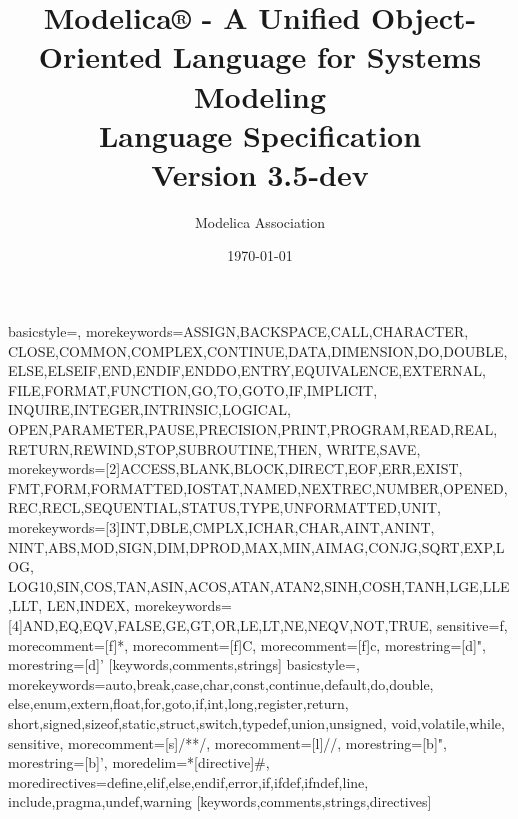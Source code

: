%
  {basicstyle=\footnotesize\ttfamily,        %
   morekeywords={ASSIGN,BACKSPACE,CALL,CHARACTER,%
      CLOSE,COMMON,COMPLEX,CONTINUE,DATA,DIMENSION,DO,DOUBLE,%
      ELSE,ELSEIF,END,ENDIF,ENDDO,ENTRY,EQUIVALENCE,EXTERNAL,%
      FILE,FORMAT,FUNCTION,GO,TO,GOTO,IF,IMPLICIT,%
      INQUIRE,INTEGER,INTRINSIC,LOGICAL,%
      OPEN,PARAMETER,PAUSE,PRECISION,PRINT,PROGRAM,READ,REAL,%
      RETURN,REWIND,STOP,SUBROUTINE,THEN,%
      WRITE,SAVE},%
    morekeywords=[2]{ACCESS,BLANK,BLOCK,DIRECT,EOF,ERR,EXIST,%
      FMT,FORM,FORMATTED,IOSTAT,NAMED,NEXTREC,NUMBER,OPENED,%
      REC,RECL,SEQUENTIAL,STATUS,TYPE,UNFORMATTED,UNIT},%
    morekeywords=[3]{INT,DBLE,CMPLX,ICHAR,CHAR,AINT,ANINT,%
      NINT,ABS,MOD,SIGN,DIM,DPROD,MAX,MIN,AIMAG,CONJG,SQRT,EXP,LOG,%
      LOG10,SIN,COS,TAN,ASIN,ACOS,ATAN,ATAN2,SINH,COSH,TANH,LGE,LLE,LLT,%
      LEN,INDEX},%
    morekeywords=[4]{AND,EQ,EQV,FALSE,GE,GT,OR,LE,LT,NE,NEQV,NOT,TRUE},%
   sensitive=f,%
   morecomment=[f]*,%
   morecomment=[f]C,%
   morecomment=[f]c,%
   morestring=[d]",%
   morestring=[d]'%
  }[keywords,comments,strings]%
%
  {basicstyle=\footnotesize\ttfamily,        %
   morekeywords={auto,break,case,char,const,continue,default,do,double,%
      else,enum,extern,float,for,goto,if,int,long,register,return,%
      short,signed,sizeof,static,struct,switch,typedef,union,unsigned,%
      void,volatile,while},%
   sensitive,%
   morecomment=[s]{/*}{*/},%
   morecomment=[l]//,%
   morestring=[b]",%
   morestring=[b]',%
   moredelim=*[directive]\#,%
   moredirectives={define,elif,else,endif,error,if,ifdef,ifndef,line,%
      include,pragma,undef,warning}%
  }[keywords,comments,strings,directives]%

\title{Modelica® - A Unified Object-Oriented Language for Systems
Modeling\\[2\baselineskip]Language
Specification\\[2\baselineskip]Version 3.5-dev}
\date{\today}
\author{Modelica Association}
